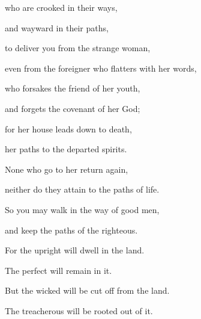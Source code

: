 {\par }{\Q {}who are crooked in their ways,
\par }{\QB and wayward in their paths,
\par }{\Q {}to deliver you from the strange woman,
\par }{\QB even from the foreigner who flatters with her words,
\par }{\Q {}who forsakes the friend of her youth,
\par }{\QB and forgets the covenant of her God;
\par }{\Q {}for her house leads down to death,
\par }{\QB her paths to the departed spirits.
\par }{\Q {}None who go to her return again,
\par }{\QB neither do they attain to the paths of life.
\par }{\Q {}So you may walk in the way of good men,
\par }{\QB and keep the paths of the righteous.
\par }{\Q {}For the upright will dwell in the land.
\par }{\QB The perfect will remain in it.
\par }{\Q {}But the wicked will be cut off from the land.
\par }{\QB The treacherous will be rooted out of it.

}
